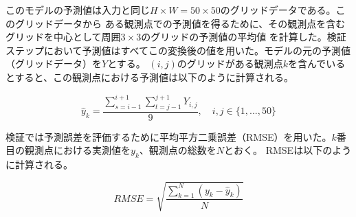 このモデルの予測値は入力と同じ$H \times W = 50 \times 50$のグリッドデータである。このグリッドデータから
ある観測点での予測値を得るために、その観測点を含むグリッドを中心として周囲$3 \times 3$のグリッドの予測値の平均値
を計算した。検証ステップにおいて予測値はすべてこの変換後の値を用いた。モデルの元の予測値（グリッドデータ）を$Y$とする。
$(i, j)$のグリッドがある観測点$k$を含んでいるとすると、この観測点における予測値は以下のように計算される。

\begin{equation}
\hat{y}_{k} = \frac{\sum_{s=i-1}^{i+1}\sum_{t=j-1}^{j+1}Y_{i,j}}{9}, \quad i, j \in \{1, ..., 50\}
\end{equation}

検証では予測誤差を評価するために平均平方二乗誤差（RMSE）を用いた。$k$番目の観測点における実測値を$y_{k}$、観測点の総数を$N$とおく。
RMSEは以下のように計算される。

\begin{equation}
RMSE = \sqrt{\frac{\sum_{k=1}^N(y_{k} - \hat{y}_{k})}{N}}
\end{equation}